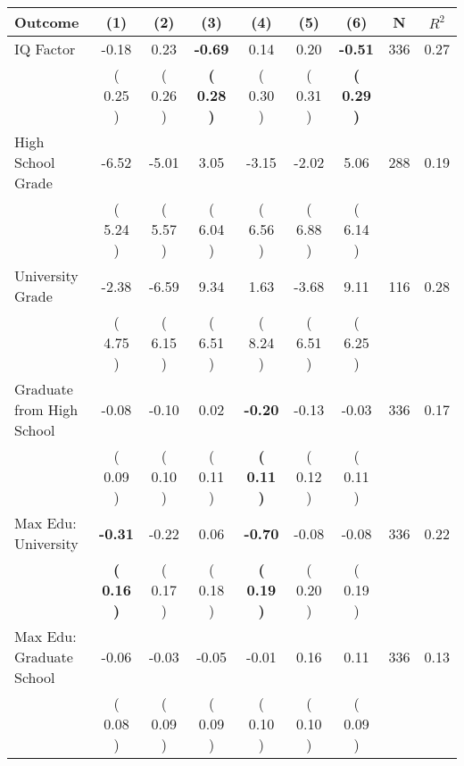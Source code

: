 \begin{tabular}{lcccccccc}
\toprule
 \textbf{Outcome} & \textbf{(1)} & \textbf{(2)} & \textbf{(3)} & \textbf{(4)} & \textbf{(5)} & \textbf{(6)} & \textbf{N} & \textbf{$ R^2$} \\
\midrule
IQ Factor &     -0.18 &      0.23 & \textbf{    -0.69} &      0.14 &      0.20 & \textbf{    -0.51} & 336 &       0.27 \\ 
 & (     0.25 ) & (     0.26 ) & \textbf{(     0.28 )} & (     0.30 ) & (     0.31 ) & \textbf{(     0.29 )} & \\
High School Grade &     -6.52 &     -5.01 &      3.05 &     -3.15 &     -2.02 &      5.06 & 288 &       0.19 \\ 
 & (     5.24 ) & (     5.57 ) & (     6.04 ) & (     6.56 ) & (     6.88 ) & (     6.14 ) & \\
University Grade &     -2.38 &     -6.59 &      9.34 &      1.63 &     -3.68 &      9.11 & 116 &       0.28 \\ 
 & (     4.75 ) & (     6.15 ) & (     6.51 ) & (     8.24 ) & (     6.51 ) & (     6.25 ) & \\
Graduate from High School &     -0.08 &     -0.10 &      0.02 & \textbf{    -0.20} &     -0.13 &     -0.03 & 336 &       0.17 \\ 
 & (     0.09 ) & (     0.10 ) & (     0.11 ) & \textbf{(     0.11 )} & (     0.12 ) & (     0.11 ) & \\
Max Edu: University & \textbf{    -0.31} &     -0.22 &      0.06 & \textbf{    -0.70} &     -0.08 &     -0.08 & 336 &       0.22 \\ 
 & \textbf{(     0.16 )} & (     0.17 ) & (     0.18 ) & \textbf{(     0.19 )} & (     0.20 ) & (     0.19 ) & \\
Max Edu: Graduate School &     -0.06 &     -0.03 &     -0.05 &     -0.01 &      0.16 &      0.11 & 336 &       0.13 \\ 
 & (     0.08 ) & (     0.09 ) & (     0.09 ) & (     0.10 ) & (     0.10 ) & (     0.09 ) & \\
\bottomrule
\end{tabular}
